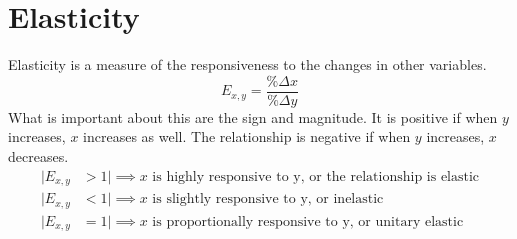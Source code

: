\documentclass[nobib]{tufte-handout}
\begin{document}
\section{Elasticity}
Elasticity is a measure of the responsiveness to the changes in other variables.
\begin{equation*}
    E_{x,y} = \frac{\%\Delta x}{\%\Delta y}
\end{equation*}
What is important about this are the sign and magnitude. It is positive if when $y$ increases, $x$ increases as well. The relationship is negative if when $y$ increases, $x$ decreases.\\
\begin{align*}
    |E_{x,y}&>1| \implies x \text{ is highly responsive to y, or the relationship is elastic}\\
    |E_{x,y}&<1| \implies x \text{ is slightly responsive to y, or inelastic}\\
    |E_{x,y}&=1| \implies x \text{ is proportionally responsive to y, or unitary elastic}
\end{align*}
\end{document}
